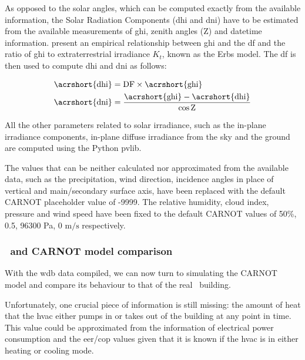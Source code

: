 As opposed to the solar angles, which can be computed exactly from the available
information, the Solar Radiation Components (\acrshort{dhi} and \acrshort{dni})
have to be estimated from the available measurements of \acrfull{ghi}, zenith
angles (Z) and datetime information.
\textcite{erbsEstimationDiffuseRadiation1982} present an empirical relationship
between \acrshort{ghi} and the \acrfull{df} and the ratio of \acrshort{ghi} to
extraterrestrial irradiance $K_t$, known as the Erbs model.  The \acrshort{df}
is then used to compute \acrshort{dhi} and \acrshort{dni} as follows:

\begin{equation}
    \begin{aligned}
        \text{\acrshort{dhi}} &= \text{DF} \times \text{\acrshort{ghi}} \\
        \text{\acrshort{dni}} &= \frac{\text{\acrshort{ghi}} -
        \text{\acrshort{dhi}}}{\cos{\text{Z}}}
    \end{aligned}
\end{equation}

All the other parameters related to solar irradiance, such as the in-plane
irradiance components, in-plane diffuse irradiance from the sky and the ground
are computed using the Python pvlib.

The values that can be neither calculated nor approximated from the available
data, such as the precipitation, wind direction, incidence angles in place of
vertical and main/secondary surface axis, have been replaced with the default
CARNOT placeholder value of -9999. The relative humidity, cloud index, pressure
and wind speed have been fixed to the default CARNOT values of 50\%, 0.5, 96300
Pa, 0 $\text{m}/\text{s}$ respectively.

\subsubsection{\pdome\ and CARNOT model comparison}\label{sec:CARNOT_comparison}

With the \acrshort{wdb} data compiled, we can now turn to simulating the CARNOT
model and compare its behaviour to that of the real \pdome\ building. 

Unfortunately, one crucial piece of information is still missing: the amount of
heat that the \acrshort{hvac} either pumps in or takes out of the building at
any point in time.  This value could be approximated from the information of
electrical power consumption and the \acrshort{eer}/\acrshort{cop} values given
that it is known if the \acrshort{hvac} is in either heating or cooling mode. 

